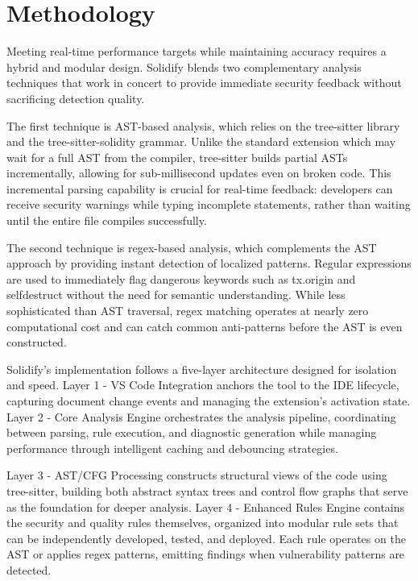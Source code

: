 \documentclass[10pt, a4paper]{article}
\begin{document}
\section{Methodology}

Meeting real-time performance targets while maintaining accuracy requires a hybrid and modular design. Solidify blends two complementary analysis techniques that work in concert to provide immediate security feedback without sacrificing detection quality.

The first technique is AST-based analysis, which relies on the tree-sitter library \cite{brunsfeld2018} and the tree-sitter-solidity grammar. Unlike the standard extension which may wait for a full AST from the compiler, tree-sitter builds partial ASTs incrementally, allowing for sub-millisecond updates even on broken code. This incremental parsing capability is crucial for real-time feedback: developers can receive security warnings while typing incomplete statements, rather than waiting until the entire file compiles successfully.

The second technique is regex-based analysis, which complements the AST approach by providing instant detection of localized patterns. Regular expressions are used to immediately flag dangerous keywords such as tx.origin and selfdestruct without the need for semantic understanding. While less sophisticated than AST traversal, regex matching operates at nearly zero computational cost and can catch common anti-patterns before the AST is even constructed.

Solidify's implementation follows a five-layer architecture designed for isolation and speed. Layer 1 - VS Code Integration anchors the tool to the IDE lifecycle, capturing document change events and managing the extension's activation state. Layer 2 - Core Analysis Engine orchestrates the analysis pipeline, coordinating between parsing, rule execution, and diagnostic generation while managing performance through intelligent caching and debouncing strategies.

Layer 3 - AST/CFG Processing constructs structural views of the code using tree-sitter, building both abstract syntax trees and control flow graphs that serve as the foundation for deeper analysis. Layer 4 - Enhanced Rules Engine contains the security and quality rules themselves, organized into modular rule sets that can be independently developed, tested, and deployed. Each rule operates on the AST or applies regex patterns, emitting findings when vulnerability patterns are detected.
\end{document}
